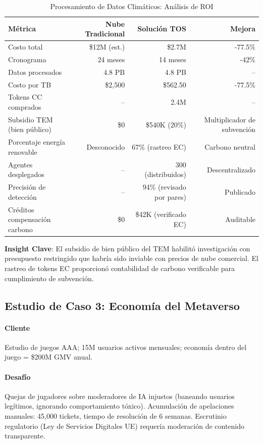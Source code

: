 \documentclass[11pt]{article}
\begin{document}
\begin{table}[H]
\centering
\caption{Procesamiento de Datos Climáticos: Análisis de ROI}
\label{tab:climate-roi}
\begin{tabular}{@{}lrrr@{}}
\toprule
\textbf{Métrica} & \textbf{Nube Tradicional} & \textbf{Solución TOS} & \textbf{Mejora} \\ \midrule
Costo total & \$12M (est.) & \$2.7M & -77.5\% \\
Cronograma & 24 meses & 14 meses & -42\% \\
Datos procesados & 4.8 PB & 4.8 PB & -- \\
Costo por TB & \$2,500 & \$562.50 & -77.5\% \\
Tokens CC comprados & -- & 2.4M & -- \\
Subsidio TEM (bien público) & \$0 & \$540K (20\%) & Multiplicador de subvención \\
Porcentaje energía renovable & Desconocido & 67\% (rastreo EC) & Carbono neutral \\
Agentes desplegados & -- & 300 (distribuidos) & Descentralizado \\
Precisión de detección & -- & 94\% (revisado por pares) & Publicado \\
Créditos compensación carbono & \$0 & \$42K (verificado EC) & Auditable \\
\bottomrule
\end{tabular}
\end{table}

\textbf{Insight Clave}: El subsidio de bien público del TEM habilitó investigación con presupuesto restringido que habría sido inviable con precios de nube comercial. El rastreo de tokens EC proporcionó contabilidad de carbono verificable para cumplimiento de subvención.

\subsection{Estudio de Caso 3: Economía del Metaverso}

\paragraph{Cliente} Estudio de juegos AAA; 15M usuarios activos mensuales; economía dentro del juego = \$200M GMV anual.

\paragraph{Desafío} Quejas de jugadores sobre moderadores de IA injustos (baneando usuarios legítimos, ignorando comportamiento tóxico). Acumulación de apelaciones manuales: 45,000 tickets, tiempo de resolución de 6 semanas. Escrutinio regulatorio (Ley de Servicios Digitales UE) requería moderación de contenido transparente.
\end{document}
